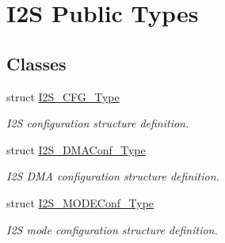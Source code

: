 \hypertarget{group___i2_s___public___types}{\section{\-I2\-S \-Public \-Types}
\label{group___i2_s___public___types}
}
\subsection*{\-Classes}
\begin{DoxyCompactItemize}
\item 
struct \hyperlink{struct_i2_s___c_f_g___type}{\-I2\-S\-\_\-\-C\-F\-G\-\_\-\-Type}
\begin{DoxyCompactList}\small\item\em \-I2\-S configuration structure definition. \end{DoxyCompactList}\item 
struct \hyperlink{struct_i2_s___d_m_a_conf___type}{\-I2\-S\-\_\-\-D\-M\-A\-Conf\-\_\-\-Type}
\begin{DoxyCompactList}\small\item\em \-I2\-S \-D\-M\-A configuration structure definition. \end{DoxyCompactList}\item 
struct \hyperlink{struct_i2_s___m_o_d_e_conf___type}{\-I2\-S\-\_\-\-M\-O\-D\-E\-Conf\-\_\-\-Type}
\begin{DoxyCompactList}\small\item\em \-I2\-S mode configuration structure definition. \end{DoxyCompactList}\end{DoxyCompactItemize}
